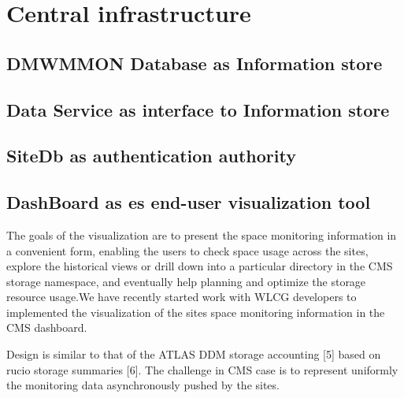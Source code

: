 \section {Central infrastructure}


\subsection {DMWMMON Database as Information store}


\subsection {Data Service as interface to Information store}

\subsection {SiteDb as authentication authority}



\subsection {DashBoard as es end-user visualization tool}

The goals of the visualization are to present the space monitoring information in a convenient form, enabling the users to check space usage across the sites, explore the historical views or drill down into a particular directory in the CMS storage namespace, and eventually help planning and optimize the storage resource usage.We have recently started work with WLCG developers to implemented the visualization of the sites space monitoring information in the CMS dashboard.

Design is similar to that of the ATLAS DDM storage accounting [5] based on rucio storage summaries [6]. The challenge in CMS case is to represent uniformly the monitoring data asynchronously pushed by the sites.
